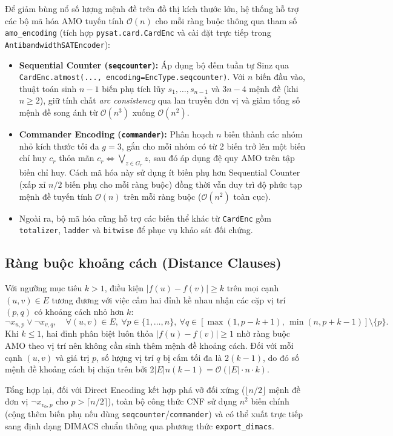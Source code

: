 \documentclass[a4paper,fleqn]{cas-sc}
\begin{document}
Để giảm bùng nổ số lượng mệnh đề trên đồ thị kích thước lớn, hệ thống hỗ trợ các bộ mã hóa AMO tuyến tính $\mathcal{O}(n)$ cho mỗi ràng buộc thông qua tham số \texttt{amo\_encoding} (tích hợp \texttt{pysat.card.CardEnc} và cài đặt trực tiếp trong \texttt{AntibandwidthSATEncoder}):
\begin{itemize}
    \item \textbf{Sequential Counter (\texttt{seqcounter}):} Áp dụng bộ đếm tuần tự Sinz qua \texttt{CardEnc.atmost(..., encoding=EncType.seqcounter)}. Với $n$ biến đầu vào, thuật toán sinh $n - 1$ biến phụ tích lũy $s_1, \dots, s_{n-1}$ và $3n - 4$ mệnh đề (khi $n \ge 2$), giữ tính chất \textit{arc consistency} qua lan truyền đơn vị và giảm tổng số mệnh đề song ánh từ $\mathcal{O}(n^3)$ xuống $\mathcal{O}(n^2)$.
    \item \textbf{Commander Encoding (\texttt{commander}):} Phân hoạch $n$ biến thành các nhóm nhỏ kích thước tối đa $g = 3$, gắn cho mỗi nhóm có từ 2 biến trở lên một biến chỉ huy $c_r$ thỏa mãn $c_r \iff \bigvee_{z \in G_r} z$, sau đó áp dụng đệ quy AMO trên tập biến chỉ huy. Cách mã hóa này sử dụng ít biến phụ hơn Sequential Counter (xấp xỉ $n/2$ biến phụ cho mỗi ràng buộc) đồng thời vẫn duy trì độ phức tạp mệnh đề tuyến tính $\mathcal{O}(n)$ trên mỗi ràng buộc ($\mathcal{O}(n^2)$ toàn cục).
    \item Ngoài ra, bộ mã hóa cũng hỗ trợ các biến thể khác từ \texttt{CardEnc} gồm \texttt{totalizer}, \texttt{ladder} và \texttt{bitwise} để phục vụ khảo sát đối chứng.
\end{itemize}

\subsection{Ràng buộc khoảng cách (Distance Clauses)}
Với ngưỡng mục tiêu $k > 1$, điều kiện $|f(u) - f(v)| \ge k$ trên mọi cạnh $(u, v) \in E$ tương đương với việc cấm hai đỉnh kề nhau nhận các cặp vị trí $(p, q)$ có khoảng cách nhỏ hơn $k$:
\[
\neg x_{u,p} \lor \neg x_{v,q}, \quad \forall (u, v) \in E,\ \forall p \in \{1, \dots, n\},\ \forall q \in [\max(1, p - k + 1),\, \min(n, p + k - 1)] \setminus \{p\}.
\]
Khi $k \le 1$, hai đỉnh phân biệt luôn thỏa $|f(u) - f(v)| \ge 1$ nhờ ràng buộc AMO theo vị trí nên không cần sinh thêm mệnh đề khoảng cách. Đối với mỗi cạnh $(u, v)$ và giá trị $p$, số lượng vị trí $q$ bị cấm tối đa là $2(k - 1)$, do đó số mệnh đề khoảng cách bị chặn trên bởi $2|E| n (k - 1) = \mathcal{O}(|E| \cdot n \cdot k)$.

Tổng hợp lại, đối với Direct Encoding kết hợp phá vỡ đối xứng ($\lfloor n/2 \rfloor$ mệnh đề đơn vị $\neg x_{v_0, p}$ cho $p > \lceil n/2 \rceil$), toàn bộ công thức CNF sử dụng $n^2$ biến chính (cộng thêm biến phụ nếu dùng \texttt{seqcounter}/\texttt{commander}) và có thể xuất trực tiếp sang định dạng DIMACS chuẩn thông qua phương thức \texttt{export\_dimacs}.
\end{document}
